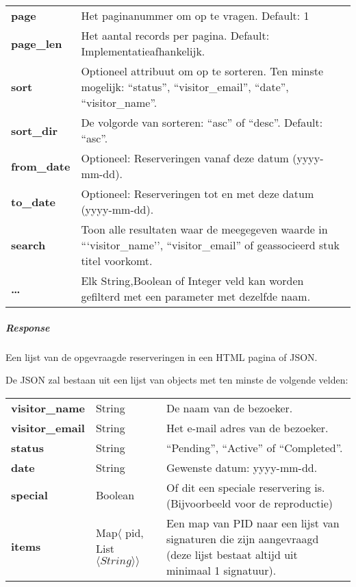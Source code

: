 \documentclass[a4paper,titlepage]{report}
\begin{document}
            \begin{tabular}{l p{13cm}}
              \textbf{page} & Het paginanummer om op te vragen. Default: 1\\
              \textbf{page\_len} & Het aantal records per pagina. Default:
              Implementatieafhankelijk. \\
              \textbf{sort} & Optioneel attribuut om op te sorteren. Ten
              minste mogelijk: ``status'', ``visitor\_email'', ``date'', ``visitor\_name''. \\
              \textbf{sort\_dir} & De volgorde van sorteren: ``asc'' of
              ``desc''. Default: ``asc''.\\
              \textbf{from\_date} & Optioneel: Reserveringen vanaf deze datum
              (yyyy-mm-dd).\\
              \textbf{to\_date} & Optioneel: Reserveringen tot en met deze datum
              (yyyy-mm-dd).\\
              \textbf{search} & Toon alle resultaten waar de meegegeven waarde
              in ```visitor\_name'', ``visitor\_email'' of geassocieerd stuk titel
              voorkomt.\\
              \textbf{\ldots} & Elk String,Boolean of Integer veld kan worden
              gefilterd met een parameter met dezelfde naam.
            \end{tabular}

          \subparagraph{Response}
            Een lijst van de opgevraagde reserveringen in een HTML pagina of
            JSON.

            De JSON zal bestaan uit een lijst van objects met ten minste de
            volgende velden:\\

            \begin{tabular}{ l l p{10cm} }
              \textbf{visitor\_name} & String & De naam van de bezoeker. \\
              \textbf{visitor\_email} & String & Het e-mail adres van de bezoeker. \\
              \textbf{status} & String & ``Pending'', ``Active'' of ``Completed''. \\
              \textbf{date} & String & Gewenste datum: yyyy-mm-dd. \\
              \textbf{special} & Boolean & Of dit een speciale reservering is.
                (Bijvoorbeeld voor de reproductie)\\
              \textbf{items} & Map$\langle$ pid, List$\langle String
                \rangle\rangle$ & Een map van PID naar een lijst van signaturen
                die zijn aangevraagd (deze lijst bestaat altijd uit minimaal 1
                signatuur).\\
            \end{tabular}
\end{document}
